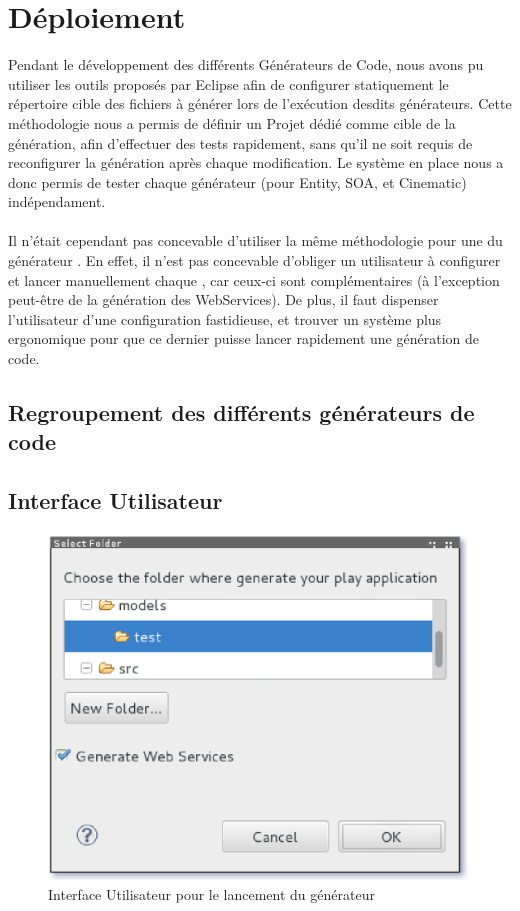 \section{Déploiement}

Pendant le développement des différents Générateurs de Code, nous avons pu utiliser les outils proposés par Eclipse afin de configurer statiquement le répertoire cible des fichiers à générer lors de l'exécution desdits générateurs. Cette méthodologie nous a permis de définir un Projet \kwplay dédié comme cible de la génération, afin d'effectuer des tests rapidement, sans qu'il ne soit requis de reconfigurer la génération après chaque modification. Le système en place nous a donc permis de tester chaque générateur (pour Entity, SOA, et Cinematic) indépendament.
\\\\
Il n'était cependant pas concevable d'utiliser la même méthodologie pour une  du générateur \kwplay. En effet, il n'est pas concevable d'obliger un utilisateur à configurer et lancer manuellement chaque , car ceux-ci sont complémentaires (à l'exception peut-être de la génération des WebServices). De plus, il faut dispenser l'utilisateur d'une configuration fastidieuse, et trouver un système plus ergonomique pour que ce dernier puisse lancer rapidement une génération de code.

\subsection{Regroupement des différents générateurs de code}

\subsection{Interface Utilisateur}


\begin{figure}[htb]
  \centering
  \includegraphics[scale=0.6]{img/screen_ui.eps}
  \caption{Interface Utilisateur pour le lancement du générateur}
  \label{fig:acceleo}
\end{figure}